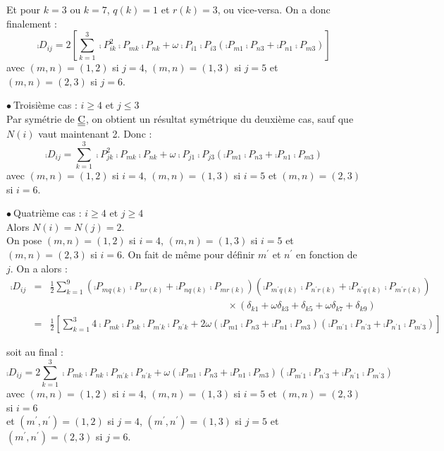 Et pour $k=3$ ou $k=7$, $q(k)=1$ et $r(k)=3$, ou vice-versa. On a donc
finalement :
\begin{equation}
\comp{D}_{ij}=2\left[\sum_{k=1}^3
\comp{P}_{ik}^2\comp{P}_{mk}\comp{P}_{nk}
+\omega\comp{P}_{i1}\comp{P}_{i3}\left(
\comp{P}_{m1}\comp{P}_{n3}+\comp{P}_{n1}\comp{P}_{m3}\right)
\right]
\end{equation}
avec $(m,n)=(1,2)$ si $j=4$, $(m,n)=(1,3)$ si $j=5$ et $(m,n)=(2,3)$ si
$j=6$.

\vspace{1cm}
$\bullet\ ${\sc Troisi\`eme cas} : $i\geqslant 4$ et $j\leqslant 3$\\
Par sym\'etrie de $\underline{\underline{\textrm{C}}}$, on obtient un r\'esultat sym\'etrique du
deuxi\`eme cas, sauf que $N(i)$ vaut maintenant 2. Donc :
\begin{equation}
\comp{D}_{ij}=\sum_{k=1}^3
\comp{P}_{jk}^2\comp{P}_{mk}\comp{P}_{nk}
+\omega\comp{P}_{j1}\comp{P}_{j3}\left(
\comp{P}_{m1}\comp{P}_{n3}+\comp{P}_{n1}\comp{P}_{m3}\right)
\end{equation}
avec $(m,n)=(1,2)$ si $i=4$, $(m,n)=(1,3)$ si $i=5$ et $(m,n)=(2,3)$ si
$i=6$.

\vspace{1cm}
$\bullet\ ${\sc Quatri\`eme cas} : $i\geqslant 4$ et $j\geqslant 4$\\
Alors $N(i)=N(j)=2$.\\
On pose $(m,n)=(1,2)$ si $i=4$, $(m,n)=(1,3)$ si $i=5$ et
$(m,n)=(2,3)$ si $i=6$. On fait de m\^eme pour d\'efinir $m^\prime$ et
$n^\prime$ en fonction de $j$. On a alors :
\begin{eqnarray}
\comp{D}_{ij}&=&\frac{1}{2}\sum_{k=1}^9
\left(\comp{P}_{mq(k)}\comp{P}_{nr(k)}+\comp{P}_{nq(k)}\comp{P}_{mr(k)}\right)
\left(\comp{P}_{m^\prime q(k)}\comp{P}_{n^\prime r(k)}
+\comp{P}_{n^\prime q(k)}\comp{P}_{m^\prime r(k)}\right)\nonumber\\
&&\qquad\qquad\qquad\qquad\qquad\qquad\qquad\qquad\qquad\times
(\delta_{k1}+\omega\delta_{k3}+\delta_{k5}+\omega\delta_{k7}+\delta_{k9})\nonumber\\
&=&\frac{1}{2}\left[
\sum_{k=1}^3 4\comp{P}_{mk}\comp{P}_{nk}
\comp{P}_{m^\prime k}\comp{P}_{n^\prime k}
+2\omega\left(\comp{P}_{m1}\comp{P}_{n3}+\comp{P}_{n1}\comp{P}_{m3}\right)
\left(\comp{P}_{m^\prime 1}\comp{P}_{n^\prime 3}
+\comp{P}_{n^\prime 1}\comp{P}_{m^\prime 3}\right)\right]
\end{eqnarray}

soit au final :
\begin{equation}
\comp{D}_{ij}=
2\sum_{k=1}^3 \comp{P}_{mk}\comp{P}_{nk}
\comp{P}_{m^\prime k}\comp{P}_{n^\prime k}
+\omega\left(\comp{P}_{m1}\comp{P}_{n3}+\comp{P}_{n1}\comp{P}_{m3}\right)
\left(\comp{P}_{m^\prime 1}\comp{P}_{n^\prime 3}
+\comp{P}_{n^\prime 1}\comp{P}_{m^\prime 3}\right)
\end{equation}
avec $(m,n)=(1,2)$ si $i=4$, $(m,n)=(1,3)$ si $i=5$ et $(m,n)=(2,3)$ si
$i=6$\\
et $(m^\prime ,n^\prime )=(1,2)$ si $j=4$, $(m^\prime ,n^\prime )=(1,3)$
si $j=5$ et $(m^\prime ,n^\prime )=(2,3)$ si $j=6$.


